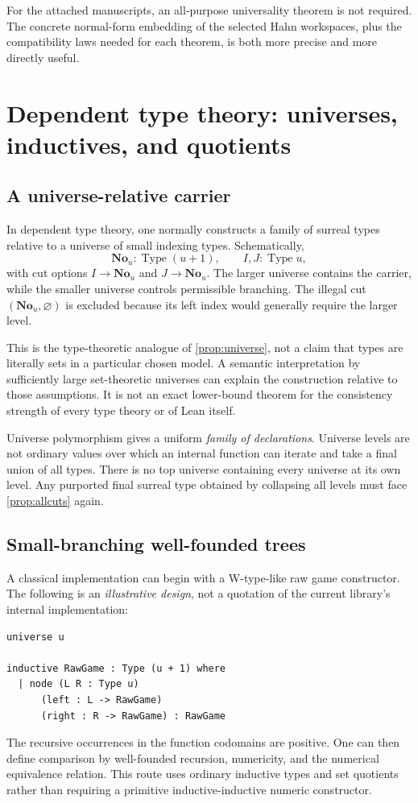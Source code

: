 \documentclass[11pt,letterpaper]{article}
\numberwithin{equation}{section}
\theoremstyle{definition}
\theoremstyle{remark}
\newcommand{\No}{\mathbf{No}}
\begin{document}
For the attached manuscripts, an all-purpose universality theorem is not required. The concrete normal-form embedding of the selected Hahn workspaces, plus the compatibility laws needed for each theorem, is both more precise and more directly useful.

\section{Dependent type theory: universes, inductives, and quotients}\label{sec:typetheory}

\subsection{A universe-relative carrier}
In dependent type theory, one normally constructs a family of surreal types relative to a universe of small indexing types. Schematically,
\[
\No_u:\operatorname{Type}(u+1),\qquad
I,J:\operatorname{Type}u,
\]
with cut options $I\to\No_u$ and $J\to\No_u$. The larger universe contains the carrier, while the smaller universe controls permissible branching. The illegal cut $(\No_u,\varnothing)$ is excluded because its left index would generally require the larger level.

This is the type-theoretic analogue of \cref{prop:universe}, not a claim that types are literally sets in a particular chosen model. A semantic interpretation by sufficiently large set-theoretic universes can explain the construction relative to those assumptions. It is not an exact lower-bound theorem for the consistency strength of every type theory or of Lean itself.

Universe polymorphism gives a uniform \emph{family of declarations}. Universe levels are not ordinary values over which an internal function can iterate and take a final union of all types. There is no top universe containing every universe at its own level. Any purported final surreal type obtained by collapsing all levels must face \cref{prop:allcuts} again.

\subsection{Small-branching well-founded trees}
A classical implementation can begin with a W-type-like raw game constructor. The following is an \emph{illustrative design}, not a quotation of the current library's internal implementation:
\begin{samepage}
\begin{lstlisting}
universe u

inductive RawGame : Type (u + 1) where
  | node (L R : Type u)
      (left : L -> RawGame)
      (right : R -> RawGame) : RawGame
\end{lstlisting}
\end{samepage}
The recursive occurrences in the function codomains are positive. One can then define comparison by well-founded recursion, numericity, and the numerical equivalence relation. This route uses ordinary inductive types and set quotients rather than requiring a primitive inductive-inductive numeric constructor.
\end{document}
